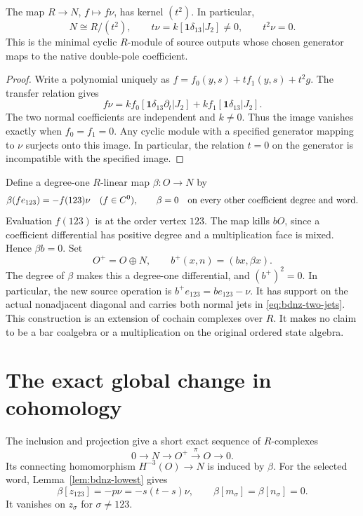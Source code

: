 \begin{proposition}\label{prop:bdnz-minimal}
The map $R\to N$, $f\mapsto f\nu$, has kernel $(t^2)$.
In particular,
\begin{equation}\label{eq:bdnz-two-jets}
 N\cong R/(t^2),\qquad
 t\nu=k[\mathbf1\delta_{13}|J_2]\ne0,\qquad t^2\nu=0.
\end{equation}
This is the minimal cyclic $R$-module of source outputs whose chosen generator maps to the native double-pole coefficient.
\end{proposition}
\begin{proof}
Write a polynomial uniquely as $f=f_0(y,s)+t f_1(y,s)+t^2g$.
The transfer relation gives
\[
 f\nu=k f_0[\mathbf1\delta_{13}\partial_t|J_2]
       +k f_1[\mathbf1\delta_{13}|J_2].
\]
The two normal coefficients are independent and $k\ne0$.
Thus the image vanishes exactly when $f_0=f_1=0$.
Any cyclic module with a specified generator mapping to $\nu$ surjects onto this image.
In particular, the relation $t=0$ on the generator is incompatible with the specified image.
\end{proof}

Define a degree-one $R$-linear map $\beta:O\to N$ by
\begin{equation}\label{eq:bdnz-beta}
 \beta(fe_{123})=-f(123)\nu\quad(f\in C^0),
 \qquad \beta=0\quad\hbox{on every other coefficient degree and word}.
\end{equation}
Evaluation $f(123)$ is at the order vertex $123$.
The map kills $bO$, since a coefficient differential has positive degree and a multiplication face is mixed.
Hence $\beta b=0$.
Set
\begin{equation}\label{eq:bdnz-extension}
 O^+=O\oplus N,
 \qquad b^+(x,n)=(bx,\beta x).
\end{equation}
The degree of $\beta$ makes this a degree-one differential, and $(b^+)^2=0$.
In particular, the new source operation is $b^+e_{123}=be_{123}-\nu$.
It has support on the actual nonadjacent diagonal and carries both normal jets in \eqref{eq:bdnz-two-jets}.
This construction is an extension of cochain complexes over $R$.
It makes no claim to be a bar coalgebra or a multiplication on the original ordered state algebra.

\section{The exact global change in cohomology}

The inclusion and projection give a short exact sequence of $R$-complexes
\begin{equation}\label{eq:bdnz-exact}
 0\longrightarrow N\longrightarrow O^+
       \xrightarrow{\pi}O\longrightarrow0.
\end{equation}
Its connecting homomorphism $H^{-3}(O)\to N$ is induced by $\beta$.
For the selected word, Lemma~\ref{lem:bdnz-lowest} gives
\begin{equation}\label{eq:bdnz-connecting}
 \beta[z_{123}]=-p\nu=-s(t-s)\nu,
 \qquad \beta[m_\sigma]=\beta[n_\sigma]=0.
\end{equation}
It vanishes on $z_\sigma$ for $\sigma\ne123$.

